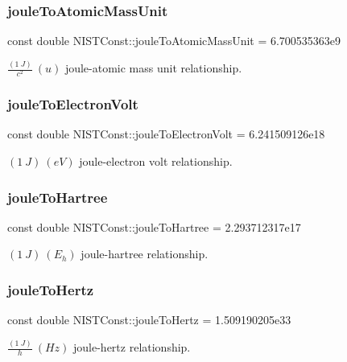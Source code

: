 \subsubsection{\texorpdfstring{joule\+To\+Atomic\+Mass\+Unit}{jouleToAtomicMassUnit}}
{\footnotesize\ttfamily const double N\+I\+S\+T\+Const\+::joule\+To\+Atomic\+Mass\+Unit = 6.\+700535363e9}

$\frac{(1\ J)}{c^2} \ (u)$ joule-\/atomic mass unit relationship. \mbox{\label{group___joule_ga08ffcdfd701ba898a91b0cbdde4d0e2d}} 
\subsubsection{\texorpdfstring{joule\+To\+Electron\+Volt}{jouleToElectronVolt}}
{\footnotesize\ttfamily const double N\+I\+S\+T\+Const\+::joule\+To\+Electron\+Volt = 6.\+241509126e18}

$(1\ J) \ (eV)$ joule-\/electron volt relationship. \mbox{\label{group___joule_gac067d2d31bf56c3abe63559dac6c00d7}} 
\subsubsection{\texorpdfstring{joule\+To\+Hartree}{jouleToHartree}}
{\footnotesize\ttfamily const double N\+I\+S\+T\+Const\+::joule\+To\+Hartree = 2.\+293712317e17}

$(1\ J) \ (E_h)$ joule-\/hartree relationship. \mbox{\label{group___joule_ga6ac361417bc6b472bf80fcfef276d742}} 
\subsubsection{\texorpdfstring{joule\+To\+Hertz}{jouleToHertz}}
{\footnotesize\ttfamily const double N\+I\+S\+T\+Const\+::joule\+To\+Hertz = 1.\+509190205e33}

$\frac{(1\ J)}{h} \ (Hz)$ joule-\/hertz relationship. \mbox{\label{group___joule_gaa8de9ad07a642c1b9c1d4ee15125a917}} 
